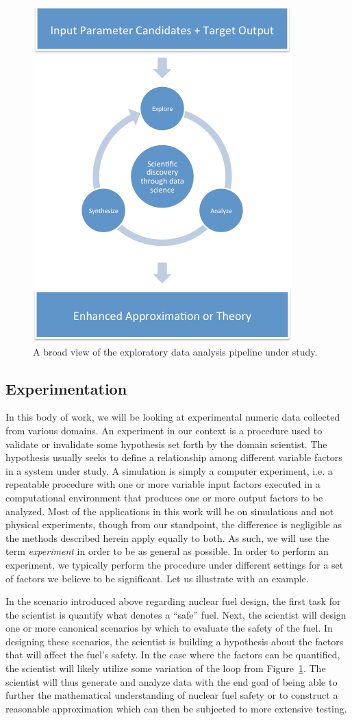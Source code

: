 \begin{figure}[t]
  \centering
  \includegraphics[width=.55\textwidth]{figs/chap1/dataCycle}
  \caption[Data Collection Cycle for Scientific Discovery]{A broad view of the exploratory data analysis pipeline under study.}
  \label{fig:dataCycle}
\end{figure}

\subsection{Experimentation}

In this body of work, we will be looking at experimental numeric data collected from various domains.
%
An experiment in our context is a procedure used to validate or invalidate some hypothesis set forth by the domain scientist.
%
The hypothesis usually seeks to define a relationship among different variable factors in a system under study.
%
A simulation is simply a computer experiment, i.e. a repeatable procedure with one or more variable input factors executed in a computational environment that produces one or more output factors to be analyzed.
%
Most of the applications in this work will be on simulations and not physical experiments, though from our standpoint, the difference is negligible as the methods described herein apply equally to both.
%
As such, we will use the term \textit{experiment} in order to be as general as possible.
%
In order to perform an experiment, we typically perform the procedure under different settings for a set of factors we believe to be significant.
%
Let us illustrate with an example.

In the scenario introduced above regarding nuclear fuel design, the first task for the scientist is quantify what denotes a ``safe'' fuel.
%
Next, the scientist will design one or more canonical scenarios by which to evaluate the safety of the fuel.
%
In designing these scenarios, the scientist is building a hypothesis about the factors that will affect the fuel's safety.
%
In the case where the factors can be quantified, the scientist will likely utilize some variation of the loop from Figure~\ref{fig:dataCycle}.
%
The scientist will thus generate and analyze data with the end goal of being able to further the mathematical understanding of nuclear fuel safety or to construct a reasonable approximation which can then be subjected to more extensive testing.

